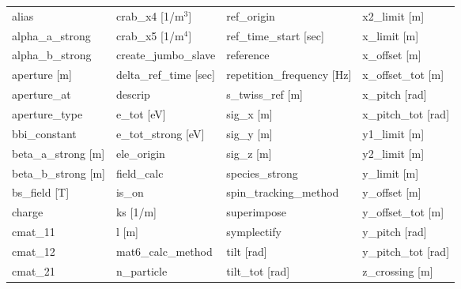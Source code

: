 \begin{tabular}{llll} \toprule
alias                            & crab_x4 [1/m$^3$]                & ref_origin                       & x2_limit [m]                     \\
alpha_a_strong                   & crab_x5 [1/m$^4$]                & ref_time_start [sec]             & x_limit [m]                      \\
alpha_b_strong                   & create_jumbo_slave               & reference                        & x_offset [m]                     \\
aperture [m]                     & delta_ref_time [sec]             & repetition_frequency [Hz]        & x_offset_tot [m]                 \\
aperture_at                      & descrip                          & s_twiss_ref [m]                  & x_pitch [rad]                    \\
aperture_type                    & e_tot [eV]                       & sig_x [m]                        & x_pitch_tot [rad]                \\
bbi_constant                     & e_tot_strong [eV]                & sig_y [m]                        & y1_limit [m]                     \\
beta_a_strong [m]                & ele_origin                       & sig_z [m]                        & y2_limit [m]                     \\
beta_b_strong [m]                & field_calc                       & species_strong                   & y_limit [m]                      \\
bs_field [T]                     & is_on                            & spin_tracking_method             & y_offset [m]                     \\
charge                           & ks [1/m]                         & superimpose                      & y_offset_tot [m]                 \\
cmat_11                          & l [m]                            & symplectify                      & y_pitch [rad]                    \\
cmat_12                          & mat6_calc_method                 & tilt [rad]                       & y_pitch_tot [rad]                \\
cmat_21                          & n_particle                       & tilt_tot [rad]                   & z_crossing [m]                   \\

\end{tabular}
